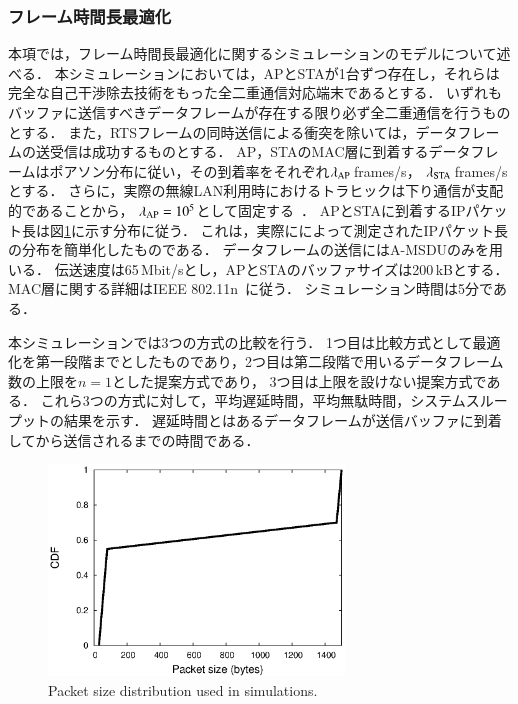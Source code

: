 \documentclass[master]{kuisthesis}		%
\begin{document}
		\subsubsection{フレーム時間長最適化}
			本項では，フレーム時間長最適化に関するシミュレーションのモデルについて述べる．
			本シミュレーションにおいては，APとSTAが1台ずつ存在し，それらは完全な自己干渉除去技術をもった全二重通信対応端末であるとする．
			いずれもバッファに送信すべきデータフレームが存在する限り必ず全二重通信を行うものとする．
			また，RTSフレームの同時送信による衝突を除いては，データフレームの送受信は成功するものとする．
			AP，STAのMAC層に到着するデータフレームはポアソン分布に従い，その到着率をそれぞれ$\lambda_{\rm{AP}}$\,frames/s，
			$\lambda_{\rm{STA}}$\,frames/sとする．
			さらに，実際の無線LAN利用時におけるトラヒックは下り通信が支配的であることから，
			$\lambda_{\rm{AP}}=10^{5}$として固定する~\cite{traffic}．
			APとSTAに到着するIPパケット長は図\ref{fig:traffic}に示す分布に従う．
			これは，実際に\cite{traffic}によって測定されたIPパケット長の分布を簡単化したものである．
			データフレームの送信にはA-MSDUのみを用いる．
			伝送速度は65\,Mbit/sとし，APとSTAのバッファサイズは200\,kBとする．
			MAC層に関する詳細はIEEE 802.11n~\cite{stdn}に従う．
			シミュレーション時間は5分である．
			\par
			本シミュレーションでは3つの方式の比較を行う．
			1つ目は比較方式として最適化を第一段階までとしたものであり，2つ目は第二段階で用いるデータフレーム数の上限を$n=1$とした提案方式であり，
			3つ目は上限を設けない提案方式である．
			これら3つの方式に対して，平均遅延時間，平均無駄時間，システムスループットの結果を示す．
			遅延時間とはあるデータフレームが送信バッファに到着してから送信されるまでの時間である．

			\begin{figure}[t]
				\begin{center}
					\includegraphics[width=0.7\textwidth]{graph/traffic.eps}
					\caption{Packet size distribution used in simulations.}
					\label{fig:traffic}
				\end{center}
			\end{figure}
\end{document}
